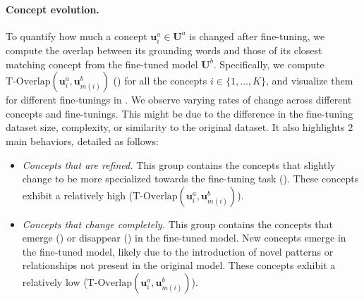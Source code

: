 \paragraph{Concept evolution.} 
To quantify how much a concept \( \bm{u}^a_{i} \in \bm{U}^a \) is changed after fine-tuning, we compute the overlap between its grounding words and those of its closest matching concept from the fine-tuned model \( \bm{U}^b \). Specifically, we compute $\text{T-Overlap}(\bm{u}^a_i , \bm{u}^b_{m(i)})$ () for all the concepts $i \in \{1, \dots , K\}$, and visualize them for different fine-tunings in .
We observe varying rates of change across different concepts and fine-tunings. This might be due to the difference in the fine-tuning dataset size, complexity, or similarity to the original dataset.
It also highlights 2 main behaviors, detailed as follows:
\begin{itemize}
    \item \textit{Concepts that are refined.} This group contains the concepts that slightly change to be more specialized towards the fine-tuning task (). These concepts exhibit a relatively high ($\text{T-Overlap}(\bm{u}^a_i , \bm{u}^b_{m(i)})$). 

     \item \textit{Concepts that change completely.}   This group contains the concepts that emerge () or disappear () in the fine-tuned model. New concepts emerge in the fine-tuned model, likely due to the introduction of novel patterns or relationships not present in the original model. These concepts exhibit a relatively low ($\text{T-Overlap}(\bm{u}^a_i , \bm{u}^b_{m(i)})$).
     
\end{itemize}













    

        
        
        



